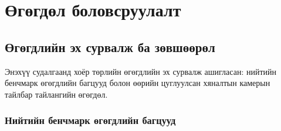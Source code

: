 
\chapter{Өгөгдөл боловсруулалт}

\section{Өгөгдлийн эх сурвалж ба зөвшөөрөл}

Энэхүү судалгаанд хоёр төрлийн өгөгдлийн эх сурвалж ашигласан: нийтийн бенчмарк өгөгдлийн багцууд болон өөрийн цуглуулсан хяналтын камерын тайлбар тайлангийн өгөгдөл.

\subsection{Нийтийн бенчмарк өгөгдлийн багцууд}

